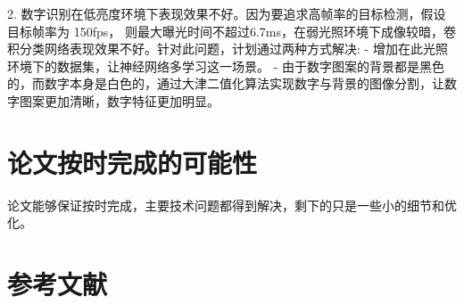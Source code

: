 2. 数字识别在低亮度环境下表现效果不好。因为要追求高帧率的目标检测，假设目标帧率为 150fps，
则最大曝光时间不超过6.7ms，在弱光照环境下成像较暗，卷积分类网络表现效果不好。针对此问题，计划通过两种方式解决:
- 增加在此光照环境下的数据集，让神经网络多学习这一场景。
- 由于数字图案的背景都是黑色的，而数字本身是白色的，通过大津二值化算法实现数字与背景的图像分割，让数字图案更加清晰，数字特征更加明显。\par
\section{论文按时完成的可能性}
论文能够保证按时完成，主要技术问题都得到解决，剩下的只是一些小的细节和优化。\par
\section{参考文献}



